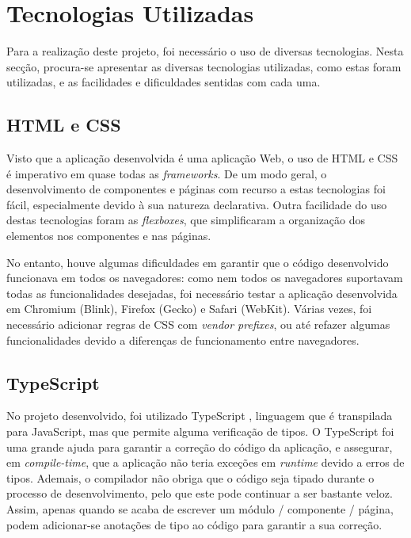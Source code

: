 \documentclass[12pt, a4paper]{article}
\begin{document}
\section{Tecnologias Utilizadas}

Para a realização deste projeto, foi necessário o uso de diversas tecnologias. Nesta secção,
procura-se apresentar as diversas tecnologias utilizadas, como estas foram utilizadas, e as
facilidades e dificuldades sentidas com cada uma.

\subsection{HTML e CSS}

Visto que a aplicação desenvolvida é uma aplicação Web, o uso de HTML e CSS é imperativo em quase
todas as \emph{frameworks}. De um modo geral, o desenvolvimento de componentes e páginas com recurso
a estas tecnologias foi fácil, especialmente devido à sua natureza declarativa. Outra facilidade do
uso destas tecnologias foram as \emph{flexboxes}, que simplificaram a organização dos elementos nos
componentes e nas páginas.

No entanto, houve algumas dificuldades em garantir que o código desenvolvido funcionava em todos os
navegadores: como nem todos os navegadores suportavam todas as funcionalidades desejadas, foi
necessário testar a aplicação desenvolvida em Chromium (Blink), Firefox (Gecko) e Safari (WebKit).
Várias vezes, foi necessário adicionar regras de CSS com \emph{vendor prefixes}, ou até refazer
algumas funcionalidades devido a diferenças de funcionamento entre navegadores.

\subsection{TypeScript}


No projeto desenvolvido, foi utilizado TypeScript \cite{typescript}, linguagem que é transpilada
para JavaScript, mas que permite alguma verificação de tipos. O TypeScript foi uma grande ajuda para
garantir a correção do código da aplicação, e assegurar, em \emph{compile-time}, que a aplicação não
teria exceções em \emph{runtime} devido a erros de tipos. Ademais, o compilador não obriga que o
código seja tipado durante o processo de desenvolvimento, pelo que este pode continuar a ser
bastante veloz. Assim, apenas quando se acaba de escrever um módulo / componente / página, podem
adicionar-se anotações de tipo ao código para garantir a sua correção.
\end{document}

